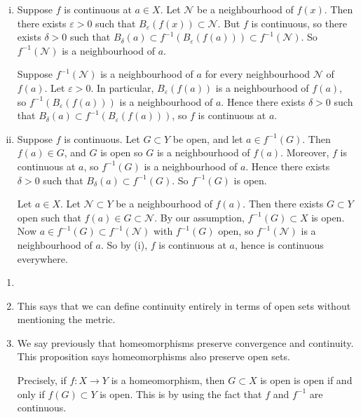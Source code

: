 \documentclass[12pt]{article}
\begin{document}
\begin{proofbox}
\begin{enumerate}[(i)]
	\item Suppose $f$ is continuous at $a \in X$. Let $\mathcal{N}$ be a neighbourhood of $f(x)$. Then there exists $\varepsilon > 0$ such that $B_{\varepsilon}(f(x)) \subset \mathcal{N}$. But $f$ is continuous, so there exists $\delta > 0$ such that $B_{\delta}(a) \subset f^{-1}(B_{\varepsilon}(f(a))) \subset f^{-1}(\mathcal{N})$. So $f^{-1}(\mathcal{N})$ is a neighbourhood of $a$.

		Suppose $f^{-1}(\mathcal{N})$ is a neighbourhood of $a$ for every neighbourhood $\mathcal{N}$ of $f(a)$. Let $\varepsilon > 0$. In particular, $B_{\varepsilon}(f(a))$ is a neighbourhood of $f(a)$, so $f^{-1}(B_{\varepsilon}(f(a)))$ is a neighbourhood of $a$. Hence there exists $\delta > 0$ such that $B_{\delta}(a) \subset f^{-1}(B_{\varepsilon}(f(a)))$, so $f$ is continuous at $a$.

	\item Suppose $f$ is continuous. Let $G \subset Y$ be open, and let $a \in f^{-1}(G)$. Then $f(a) \in G$, and $G$ is open so $G$ is a neighbourhood of $f(a)$. Moreover, $f$ is continuous at $a$, so $f^{-1}(G)$ is a neighbourhood of $a$.  Hence there exists $\delta > 0$ such that $B_{\delta}(a) \subset f^{-1}(G)$. So $f^{-1}(G)$ is open.

		Let $a \in X$. Let $\mathcal{N} \subset Y$ be a neighbourhood of $f(a)$. Then there exists $G \subset Y$ open such that $f(a) \in G \subset \mathcal{N}$. By our assumption, $f^{-1}(G) \subset X$ is open. Now $a \in f^{-1}(G) \subset f^{-1}(\mathcal{N})$ with $f^{-1}(G)$ open, so $f^{-1}(\mathcal{N})$ is a neighbourhood of $a$. So by (i), $f$ is continuous at $a$, hence is continuous everywhere.
\end{enumerate}
\end{proofbox}

\begin{remark}
	\begin{enumerate}[1.]
		\item[]
		\item This says that we can define continuity entirely in terms of open sets without mentioning the metric.
		\item We say previously that homeomorphisms preserve convergence and continuity. This proposition says homeomorphisms also preserve open sets.

			Precisely, if $f : X \to Y$ is a homeomorphism, then $G \subset X$ is open is open if and only if $f(G) \subset Y$ is open. This is by using the fact that $f$ and $f^{-1}$ are continuous.
	\end{enumerate}
\end{remark}
\end{document}
